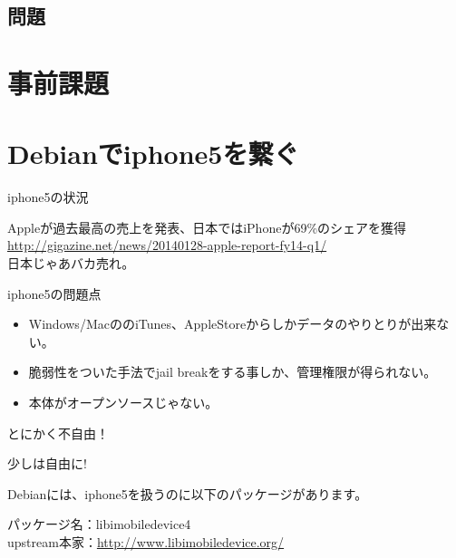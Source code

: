 \subsection{問題}



\section{事前課題}
{\footnotesize

}

\section{Debianでiphone5を繋ぐ}

\begin{frame}{iphone5の状況}

\begin{center}
\LARGE Appleが過去最高の売上を発表、日本ではiPhoneが69\%のシェアを獲得\\
\url{http://gigazine.net/news/20140128-apple-report-fy14-q1/}\\
日本じゃあバカ売れ。
\end{center}

\end{frame}

\begin{frame}{iphone5の問題点}

\begin{itemize}
\item Windows/MacののiTunes、AppleStoreからしかデータのやりとりが出来ない。
\item 脆弱性をついた手法でjail breakをする事しか、管理権限が得られない。
\item 本体がオープンソースじゃない。
\end{itemize}

\begin{center}
 \LARGE とにかく不自由！
\end{center}

\end{frame}

\begin{frame}{少しは自由に!}

 Debianには、iphone5を扱うのに以下のパッケージがあります。

\begin{center}
パッケージ名：libimobiledevice4\\
upstream本家：\url{http://www.libimobiledevice.org/}
\end{center} 

\end{frame}

